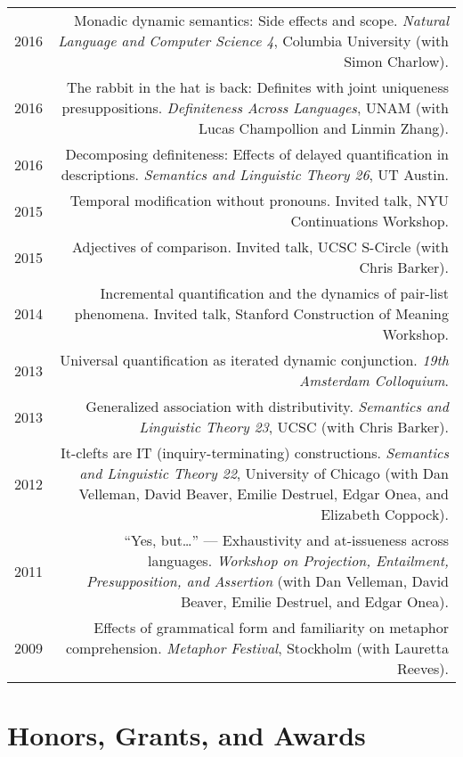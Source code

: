 \documentclass[11pt]{article}
\begin{document}
\begin{longtable}{LR}
  2016 &  Monadic dynamic semantics: Side effects and scope. \textit{Natural
          Language and Computer Science 4}, Columbia University (with Simon
          Charlow).\\
  2016 &  The rabbit in the hat is back: Definites with joint uniqueness
          presuppositions. \textit{Definiteness Across Languages}, UNAM (with
          Lucas Champollion and Linmin Zhang).\\
  2016 &  Decomposing definiteness: Effects of delayed quantification in
          descriptions. \textit{Semantics and Linguistic Theory 26}, UT Austin.\\
  2015 &  Temporal modification without pronouns. Invited talk, NYU
          Continuations Workshop.\\
  2015 &  Adjectives of comparison. Invited talk, UCSC S-Circle (with Chris
          Barker).\\
  2014 &  Incremental quantification and the dynamics of pair-list phenomena.
          Invited talk, Stanford Construction of Meaning Workshop.\\
  2013 &  Universal quantification as iterated dynamic conjunction. \textit{19th
          Amsterdam Colloquium}.\\
  2013 &  Generalized association with distributivity. \textit{Semantics and
          Linguistic Theory 23}, UCSC (with Chris Barker).\\
  2012 &  It-clefts are IT (inquiry-terminating) constructions.
          \textit{Semantics and Linguistic Theory 22}, University of Chicago
          (with Dan Velleman, David Beaver, Emilie Destruel, Edgar Onea, and
          Elizabeth Coppock).\\
  2011 &  ``Yes, but\dots'' --- Exhaustivity and at-issueness across languages.
          \textit{Workshop on Projection, Entailment, Presupposition, and
          Assertion} (with Dan Velleman, David Beaver, Emilie Destruel, and
          Edgar Onea).\\
  2009 &  Effects of grammatical form and familiarity on metaphor
          comprehension. \textit{Metaphor Festival}, Stockholm (with Lauretta Reeves).
\end{longtable}


\section*{Honors, Grants, and Awards}
\end{document}
